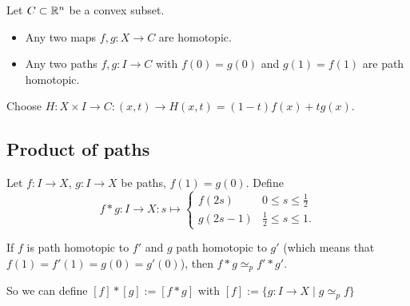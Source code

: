 \begin{eg}
   Let $C \subset \mathbb{R}^n$ be a convex subset.
   \begin{itemize}
       \item Any two maps $f, g: X \to C$ are homotopic.
       \item Any two paths $f, g: I \to  C$ with $f(0) = g(0)$ and  $g(1) = f(1)$ are path homotopic.
   \end{itemize}

   Choose $H: X \times I \to  C: (x, t) \to  H(x, t) = (1-t) f(x) + t g(x)$.
\end{eg}


\subsection*{Product of paths}
Let $f: I\to X$, $g: I \to X$ be paths, $f(1) = g(0)$.
Define  \[
    f*g: I \to X: s \mapsto \begin{cases}
        f(2s) & 0 \le  s \le  \frac{1}{2}\\
        g(2s - 1) & \frac{1}{2}\le s\le 1.
\end{cases}
\]
\begin{remark}
    If $f$ is path homotopic to $f'$ and $g$ path homotopic to $g'$ (which means that $f(1) = f'(1) = g(0) = g'(0)$), then $f * g \simeq_p f' * g'$.
\end{remark}

So we can define $[f] * [g] := [f*g]$ with $[f] := \{g : I \to  X  \mid g \simeq_p f\} $

